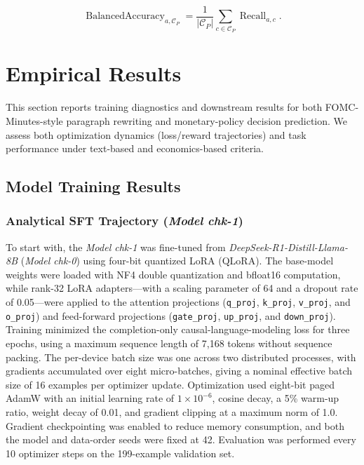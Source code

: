 \begin{equation}
    \operatorname{BalancedAccuracy}_{a,\mathcal{C}_P}
    =
    \frac{1}{|\mathcal{C}_P|}
    \sum_{c\in\mathcal{C}_P}
    \operatorname{Recall}_{a,c}.
    \label{eq:ch2:decision_balanced_accuracy}
\end{equation}





\section{Empirical Results}\label{ch2:sec:result}

This section reports training diagnostics and downstream results for both FOMC-Minutes-style paragraph rewriting and monetary-policy decision prediction. We assess both optimization dynamics (loss/reward trajectories) and task performance under text-based and economics-based criteria.



\subsection*{Model Training Results}

\subsubsection*{Analytical SFT Trajectory (\textit{Model chk-1})}

To start with, the \textit{Model chk-1} was fine-tuned from \textit{DeepSeek-R1-Distill-Llama-8B} (\textit{Model chk-0}) using four-bit quantized LoRA (QLoRA). The base-model weights were loaded with NF4 double quantization and bfloat16 computation, while rank-32 LoRA adapters—with a scaling parameter of 64 and a dropout rate of 0.05—were applied to the attention projections (\texttt{q\_proj}, \texttt{k\_proj}, \texttt{v\_proj}, and \texttt{o\_proj}) and feed-forward projections (\texttt{gate\_proj}, \texttt{up\_proj}, and \texttt{down\_proj}). Training minimized the completion-only causal-language-modeling loss for three epochs, using a maximum sequence length of 7,168 tokens without sequence packing. The per-device batch size was one across two distributed processes, with gradients accumulated over eight micro-batches, giving a nominal effective batch size of 16 examples per optimizer update. Optimization used eight-bit paged AdamW with an initial learning rate of $1\times10^{-6}$, cosine decay, a 5\% warm-up ratio, weight decay of 0.01, and gradient clipping at a maximum norm of 1.0. Gradient checkpointing was enabled to reduce memory consumption, and both the model and data-order seeds were fixed at 42. Evaluation was performed every 10 optimizer steps on the 199-example validation set.


